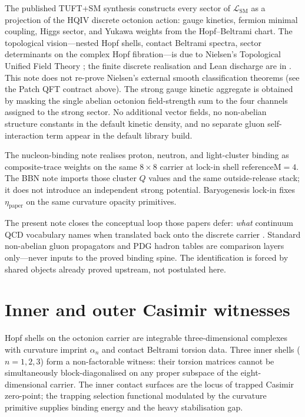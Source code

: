 \documentclass[11pt]{amsart}
\begin{document}
The published TUFT+SM synthesis \cite{hqiv-tuft-sm-lagrangian-paper} constructs
every sector of $\mathcal{L}_{\mathrm{SM}}$ as a projection of the HQIV discrete
octonion action: gauge kinetics, fermion minimal coupling, Higgs sector, and
Yukawa weights from the Hopf--Beltrami chart. The topological vision---nested Hopf
shells, contact Beltrami spectra, sector determinants on the complex Hopf
fibration---is due to Nielsen's Topological Unified Field Theory
\cite{NielsenTUFT2026}; the finite discrete realisation and Lean discharge are in
\cite{hqiv-tuft-sm-lagrangian-paper}. This note does not re-prove Nielsen's
external smooth classification theorems (see the Patch QFT contract above).
The strong gauge kinetic aggregate
is obtained by masking the single abelian octonion field-strength sum to the four
channels assigned to the strong sector. No additional vector fields, no
non-abelian structure constants in the default kinetic density, and no separate
gluon self-interaction term appear in the default library build.

The nucleon-binding note \cite{hqiv-nucleon-binding-paper} realises proton,
neutron, and light-cluster binding as composite-trace weights on the same
$8\times8$ carrier at lock-in shell $\mathrm{referenceM}=4$. The BBN note
\cite{hqiv-bbn-paper} imports those cluster $Q$ values and the same outside-release
stack; it does not introduce an independent strong potential. Baryogenesis lock-in
\cite{hqiv-baryogenesis-paper} fixes $\eta_{\mathrm{paper}}$ on the same curvature
opacity primitives.

The present note closes the conceptual loop those papers defer: \emph{what}
continuum QCD vocabulary names when translated back onto the discrete carrier
\cite{peskin1995,pdg2024}. Standard non-abelian gluon propagators and PDG hadron
tables are comparison layers only---never inputs to the proved binding spine. The
identification is forced by shared objects already proved upstream, not
postulated here.

\section{Inner and outer Casimir witnesses}
\label{sec:casimir-witnesses}

Hopf shells on the octonion carrier are integrable three-dimensional complexes
with curvature imprint $\alpha_n$ and contact Beltrami torsion data. Three inner
shells ($n=1,2,3$) form a non-factorable witness: their torsion matrices cannot be
simultaneously block-diagonalised on any proper subspace of the eight-dimensional
carrier. The inner contact surfaces are the locus of trapped Casimir zero-point;
the trapping selection functional modulated by the curvature primitive supplies
binding energy and the heavy stabilisation gap.
\end{document}
